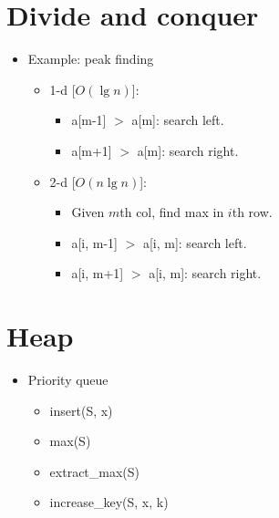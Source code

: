 \documentclass[twocolumn]{article}
\begin{document}
\section{Divide and conquer}
\begin{itemize}
\item Example: peak finding
  \begin{itemize}
  \item 1-d [$O(\lg n)$]:
    \begin{itemize}
    \item a[m-1] $>$ a[m]: search left.
    \item a[m+1] $>$ a[m]: search right.
    \end{itemize}
  \item 2-d [$O(n \lg n)$]:
    \begin{itemize}
    \item Given $m$th col, find max in $i$th row.
    \item a[i, m-1] $>$ a[i, m]: search left.
    \item a[i, m+1] $>$ a[i, m]: search right.
    \end{itemize}
  \end{itemize}

\end{itemize}
    
\section{Heap}
\begin{itemize}
\item Priority queue
  \begin{itemize}
  \item insert(S, x)
  \item max(S)
  \item extract\_max(S)
  \item increase\_key(S, x, k)
  \end{itemize}
\end{itemize}
\end{document}
